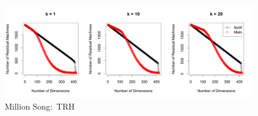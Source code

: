\begin{figure}[htpb!]
  \centering
  \includegraphics[width=1.0\linewidth]{exp/prune/trh.png}
  \caption{Million Song:~TRH}
  \label{fig:prune_trh}
\end{figure}





%
%
